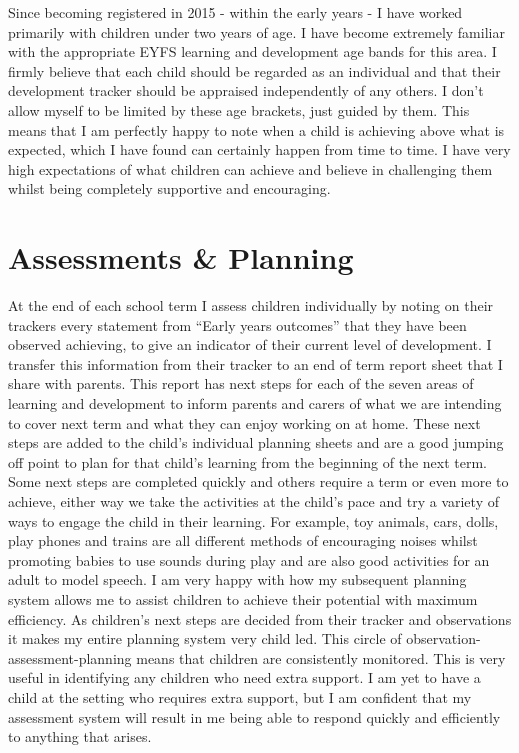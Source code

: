 \documentclass[10pt,a4paper]{report}
\begin{document}
Since becoming registered in 2015 - within the early years - I have worked primarily with children under two years of age. I have become extremely familiar with the appropriate EYFS learning and development age bands for this area. I firmly believe that each child should be regarded as an individual and that their development tracker should be appraised independently of any others. I don't allow myself to be limited by these age brackets, just guided by them. This means that I am perfectly happy to note when a child is achieving above what is expected, which I have found can certainly happen from time to time. I have very high expectations of what children can achieve and believe in challenging them whilst being completely supportive and encouraging.

\section{Assessments \& Planning}

At the end of each school term I assess children individually by noting on their trackers every statement from “Early years outcomes” that they have been observed achieving, to give an indicator of their current level of development. I transfer this information from their tracker to an end of term report sheet that I share with parents. This report has next steps for each of the seven areas of learning and development to inform parents and carers of what we are intending to cover next term and what they can enjoy working on at home. These next steps are added to the child's individual planning sheets and are a good jumping off point to plan for that child's learning from the beginning of the next term. Some next steps are completed quickly and others require a term or even more to achieve, either way we take the activities at the child's pace and try a variety of ways to engage the child in their learning. For example, toy animals, cars, dolls, play phones and trains are all different methods of encouraging noises whilst promoting babies to use sounds during play and are also good activities for an adult to model speech. I am very happy with how my subsequent planning system allows me to assist children to achieve their potential with maximum efficiency. As children's next steps are decided from their tracker and observations it makes my entire planning system very child led. This circle of observation-assessment-planning means that children are consistently monitored. This is very useful in identifying any children who need extra support. I am yet to have a child at the setting who requires extra support, but I am confident that my assessment system will result in me being able to respond quickly and efficiently to anything that arises.
\end{document}

